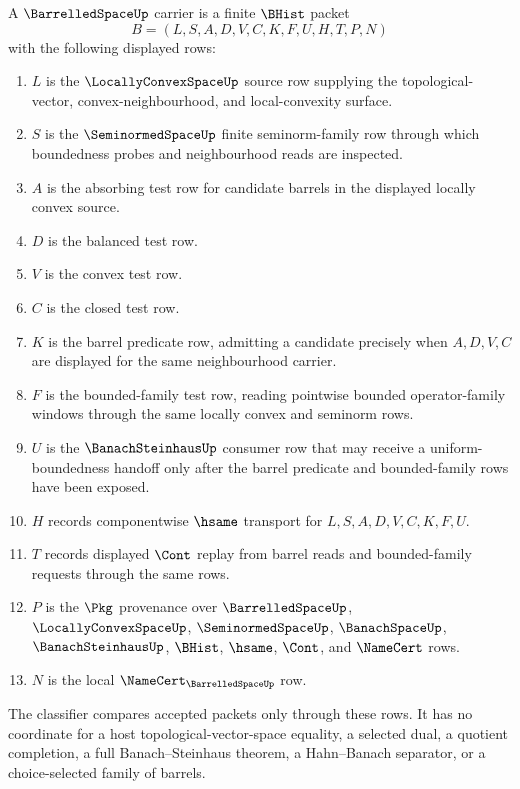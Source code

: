 \begin{definition}
\label{def:barrelled-space-carrier}
A $\BarrelledSpaceUp$ carrier is a finite $\BHist$ packet
$$
B=(L,S,A,D,V,C,K,F,U,H,T,P,N)
$$
with the following displayed rows:
\begin{enumerate}
\item $L$ is the $\LocallyConvexSpaceUp$ source row supplying the topological-vector, convex-neighbourhood, and local-convexity surface.
\item $S$ is the $\SeminormedSpaceUp$ finite seminorm-family row through which boundedness probes and neighbourhood reads are inspected.
\item $A$ is the absorbing test row for candidate barrels in the displayed locally convex source.
\item $D$ is the balanced test row.
\item $V$ is the convex test row.
\item $C$ is the closed test row.
\item $K$ is the barrel predicate row, admitting a candidate precisely when $A,D,V,C$ are displayed for the same neighbourhood carrier.
\item $F$ is the bounded-family test row, reading pointwise bounded operator-family windows through the same locally convex and seminorm rows.
\item $U$ is the $\BanachSteinhausUp$ consumer row that may receive a uniform-boundedness handoff only after the barrel predicate and bounded-family rows have been exposed.
\item $H$ records componentwise $\hsame$ transport for $L,S,A,D,V,C,K,F,U$.
\item $T$ records displayed $\Cont$ replay from barrel reads and bounded-family requests through the same rows.
\item $P$ is the $\Pkg$ provenance over $\BarrelledSpaceUp$, $\LocallyConvexSpaceUp$, $\SeminormedSpaceUp$, $\BanachSpaceUp$, $\BanachSteinhausUp$, $\BHist$, $\hsame$, $\Cont$, and $\NameCert$ rows.
\item $N$ is the local $\NameCert_{\BarrelledSpaceUp}$ row.
\end{enumerate}
The classifier compares accepted packets only through these rows. It has no coordinate for a host topological-vector-space equality, a selected dual, a quotient completion, a full Banach--Steinhaus theorem, a Hahn--Banach separator, or a choice-selected family of barrels.
\end{definition}

